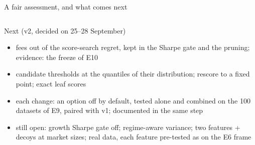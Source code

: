 \documentclass[10pt,aspectratio=169]{beamer}
\newcommand{\1}{\mathbf{1}}
\newcounter{finalframe}
\newcommand{\backupbegin}{\setcounter{finalframe}{\value{framenumber}}}
\begin{document}
\begin{frame}{A fair assessment, and what comes next}
\begin{columns}[T]
\begin{block}{Next (v2, decided on 25--28 September)}
\begin{itemize}
\item fees out of the score-search regret, kept in the Sharpe gate and the pruning; evidence: the freeze of E10
\item candidate thresholds at the quantiles of their distribution; rescore to a fixed point; exact leaf scores
\item each change: an option off by default, tested alone and combined on the 100 datasets of E9, paired with v1; documented in the same step
\item still open: growth Sharpe gate off; regime-aware variance; two features + decoys at market sizes; real data, each feature pre-tested as on the E6 frame
\end{itemize}
\end{block}
\end{columns}
\end{frame}

\appendix
\backupbegin
\end{document}

